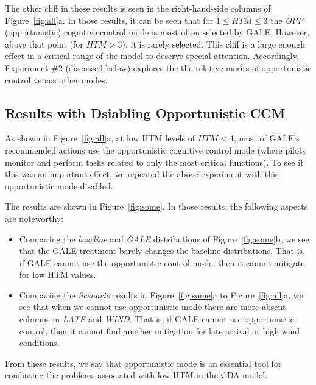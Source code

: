 \documentclass[journal]{IEEEtran}
\newcommand{\bi}{\begin{itemize}}
\newcommand{\ei}{\end{itemize}}
\newcommand{\fig}[1]{Figure~\ref{fig:#1}}
\begin{document}
The other cliff in these results is seen in the right-hand-side columns of \fig{all}a. 
In those results, it can be seen that for  $1 \le \mathit{HTM} \le 3$ the {\em OPP} (opportunistic) cognitive control mode is most often selected by GALE. 
However, above that point (for $\mathit{HTM}>3$), it is rarely selected.
This cliff is a large enough effect in  a critical range of the model to deserve special attention.
Accordingly, Experiment \#2 (discussed below) explores the the relative merits of opportunistic control versus other modes.

\subsection{Results with Dsiabling  Opportunistic CCM}
As shown in \fig{all}a, at low HTM levels of $\mathit{HTM}<4$, most of GALE's recommended actions use the opportunistic cognitive control mode (where pilots monitor and perform tasks related to only the most critical functions). 
To see if this was  an important effect, we repeated the above experiment with this opportunistic mode disabled.

The results are shown in \fig{some}.  
In those results, the following aspects are noteworthy:
\bi
\item Comparing the {\em baseline} and {\em GALE} distributions of  \fig{some}b, we see that the GALE treatment barely changes the baseline distributions. 
That is, if GALE cannot use the opportunistic control mode, then it cannot mitigate for low HTM values.
\item
Comparing the {\em Scenario} results in \fig{some}a to \fig{all}a, we see that when we cannot use opportunistic mode there are more absent columns in {\em LATE} and {\em WIND}.
That is, if GALE cannot use opportunistic control, then it cannot find another mitigation for late arrival or high wind conditions.
\ei
From these results, we say that opportunistic mode is an essential tool for combating the problems associated with low HTM in the CDA model.
 
\end{document}
